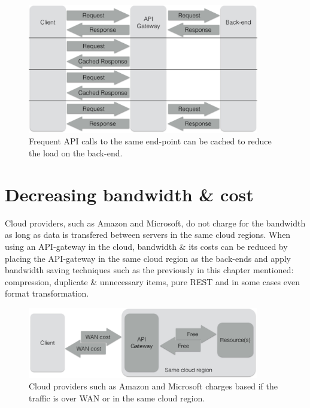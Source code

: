 \documentclass{cslthse-msc}
\begin{document}
\begin{figure}[H]
  \centering
    \begin{center}
      \includegraphics[width=0.9\textwidth]{images/api_gateway_cache.png}
    \end{center}
  \caption{Frequent API calls to the same end-point can be cached to reduce the load on the back-end.}
\end{figure}

\section{Decreasing bandwidth \& cost}
Cloud providers, such as Amazon\cite{cloud_amazon} and Microsoft\cite{cloud_microsoft}, do not charge for the bandwidth as long as data is transfered between servers in the same cloud regions. When using an API-gateway in the cloud, bandwidth \& its costs can be reduced by placing the API-gateway in the same cloud region as the back-ends and apply bandwidth saving techniques such as the previously in this chapter mentioned: compression, duplicate \& unnecessary items, pure REST and in some cases even format transformation.

\begin{figure}[H]
  \centering
    \begin{center}
      \includegraphics[width=0.9\textwidth]{images/api_gateway_bandwidth.png}
    \end{center}
  \caption{Cloud providers such as Amazon\cite{cloud_amazon} and Microsoft\cite{cloud_microsoft} charges based if the traffic is over WAN or in the same cloud region.}
\end{figure}
\end{document}
